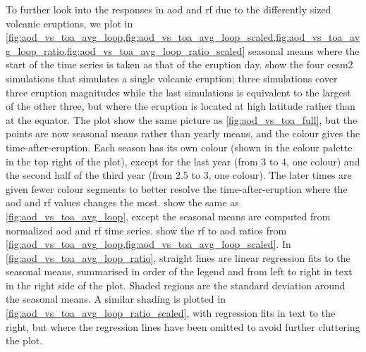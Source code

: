 \documentclass{ametsocV5}
\begin{document}
To further look into the responses in \ac{aod} and \ac{rf} due to the differently sized
volcanic eruptions, we plot in
\cref{fig:aod_vs_toa_avg_loop,fig:aod_vs_toa_avg_loop_scaled,fig:aod_vs_toa_avg_loop_ratio,fig:aod_vs_toa_avg_loop_ratio_scaled}
seasonal means where the start of the time series is taken as that of the eruption day.
 show the four \ac{cesm2} simulations that simulates a
single volcanic eruption; three simulations cover three eruption magnitudes while the
last simulations is equivalent to the largest of the other three, but where the eruption
is located at high latitude rather than at the equator. The plot show the same picture
as \cref{fig:aod_vs_toa_full}, but the points are now seasonal means rather than yearly
means, and the colour gives the time-after-eruption. Each season has its own colour
(shown in the colour palette in the top right of the plot), except for the last year
(from \(3\) to \(4\), one colour) and the second half of the third year (from \(2.5\) to
\(3\), one colour). The later times are given fewer colour segments to better resolve
the time-after-eruption where the \ac{aod} and \ac{rf} values changes the most.
 show the same as \cref{fig:aod_vs_toa_avg_loop},
except the seasonal means are computed from normalized \ac{aod} and \ac{rf} time series.
 show the
\ac{rf} to \ac{aod} ratios from
\cref{fig:aod_vs_toa_avg_loop,fig:aod_vs_toa_avg_loop_scaled}. In
\cref{fig:aod_vs_toa_avg_loop_ratio}, straight lines are linear regression fits to the
seasonal means, summarised in order of the legend and from left to right in text in the
right side of the plot. Shaded regions are the standard deviation around the seasonal
means. A similar shading is plotted in \cref{fig:aod_vs_toa_avg_loop_ratio_scaled}, with
regression fits in text to the right, but where the regression lines have been omitted
to avoid further cluttering the plot.

\end{document}
